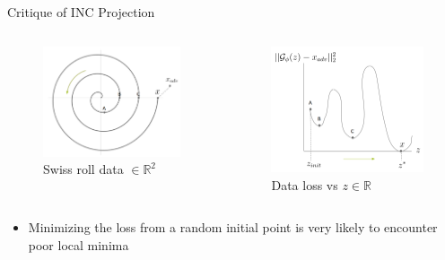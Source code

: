 \documentclass[10pt]{beamer}
\begin{document}
\begin{frame}[fragile]{Critique of INC Projection}
\begin{columns}
\begin{column}{0.5\textwidth}
 \begin{figure}[H]
    \caption{Swiss roll data $\in \mathbb{R}^2$}
    \centering
    \includegraphics[scale=0.25]{./swiss.png}
\end{figure}
\end{column}

\begin{column}{0.5\textwidth}  %
 \begin{figure}[H]
    \caption{Data loss vs $z \in \mathbb{R}$}
    \centering
    \includegraphics[scale=0.23]{./loss_swiss.png}
\end{figure}
\end{column}
\end{columns}
\begin{itemize}
    \item Minimizing the loss from a random initial point is very likely to encounter poor local minima
\end{itemize}
\end{frame}
\end{document}
